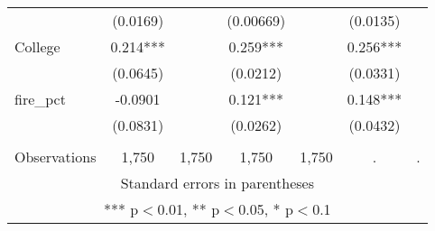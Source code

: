 \begin{tabular}{lcccccc}
 & (0.0169) &  & (0.00669) &  & (0.0135) &  \\
College & 0.214*** &  & 0.259*** &  & 0.256*** &  \\
 & (0.0645) &  & (0.0212) &  & (0.0331) &  \\
fire\_pct & -0.0901 &  & 0.121*** &  & 0.148*** &  \\
 & (0.0831) &  & (0.0262) &  & (0.0432) &  \\
 &  &  &  &  &  &  \\
 Observations & 1,750 & 1,750 & 1,750 & 1,750 & . & . \\ \hline
\multicolumn{7}{c}{ Standard errors in parentheses} \\
\multicolumn{7}{c}{ *** p$<$0.01, ** p$<$0.05, * p$<$0.1} \\
\end{tabular}
